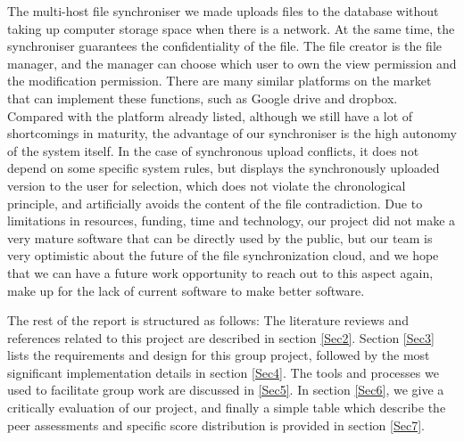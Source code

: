 \vspace{0.3cm}
\noindent The multi-host file synchroniser we made uploads files to the database without taking up computer storage space when there is a network. At the same time, the synchroniser guarantees the confidentiality of the file. The file creator is the file manager, and the manager can choose which user to own the view permission and the modification permission. There are many similar platforms on the market that can implement these functions, such as Google drive and dropbox. Compared with the platform already listed, although we still have a lot of shortcomings in maturity, the advantage of our synchroniser is the high autonomy of the system itself. In the case of synchronous upload conflicts, it does not depend on some specific system rules, but displays the synchronously uploaded version to the user for selection, which does not violate the chronological principle, and artificially avoids the content of the file contradiction. Due to limitations in resources, funding, time and technology, our project did not make a very mature software that can be directly used by the public, but our team is very optimistic about the future of the file synchronization cloud, and we hope that we can have a future work opportunity to reach out to this aspect again, make up for the lack of current software to make better software.

\vspace{0.3cm}
\noindent The rest of the report is structured as follows: The literature reviews and references related to this project are described in section \ref{Sec2}. Section \ref{Sec3} lists the requirements and design for this group project, followed by the most significant implementation details in section \ref{Sec4}. The tools and processes we used to facilitate group work are discussed in \ref{Sec5}. In section \ref{Sec6}, we give a critically evaluation of our project, and finally a simple table which describe the peer assessments and specific score distribution is provided in section \ref{Sec7}.



